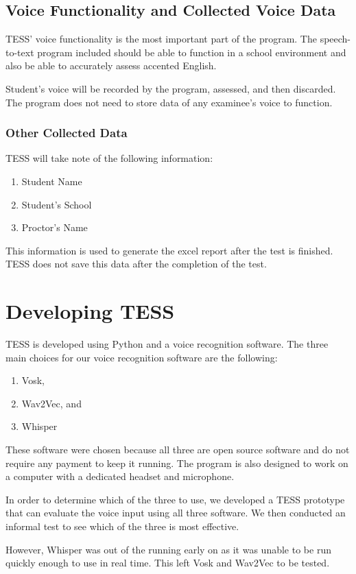 \subsection{Voice Functionality and Collected Voice Data}
TESS’ voice functionality is the most important part of the program. The speech-to-text program included should be able to function in a school environment and also be able to accurately assess accented English.

Student’s voice will be recorded by the program, assessed, and then discarded. The program does not need to store data of any examinee’s voice to function.

\subsubsection{Other Collected Data}
TESS will take note of the following information:
\begin{enumerate}
\item Student Name
\item Student’s School
\item Proctor’s Name
\end{enumerate}
This information is used to generate the excel report after the test is finished. TESS does not save this data after the completion of the test.

\section{Developing TESS}
TESS is developed using Python and a voice recognition software.
The three main choices for our voice recognition software are the following:
\begin{enumerate}
\item Vosk,
\item Wav2Vec, and
\item Whisper
\end{enumerate}
These software were chosen because all three are open source software and do not require any payment to keep it running.
The program is also designed to work on a computer with a dedicated headset and microphone.

In order to determine which of the three to use, we developed a TESS prototype that can evaluate the voice input using all three software. We then conducted an informal test to see which of the three is most effective.

However, Whisper was out of the running early on as it was unable to be run quickly enough to use in real time. This left Vosk and Wav2Vec to be tested.

